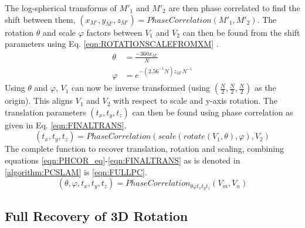 The log-spherical transforms of $M'_1$ and $M'_2$ are then phase correlated to find the shift between them, $(x_{M'},y_{M'},z_{M'}) = PhaseCorrelation(M'_1, M'_2)$. The rotation $\theta$ and scale $\varphi$ factors between $V_1$ and $V_2$ can then be found from the shift parameters using Eq. \ref{eqn:ROTATIONSCALEFROMXM} . 
\begin{equation} \label{eqn:ROTATIONSCALEFROMXM}
\begin{split}
\theta & = \frac{-360x_{M'}}{N}\\
\varphi & = e^{
-\left(
2.56^{-1}N
\right)z_{M'}N^{-1}
}
\end{split}
\end{equation}
Using $\theta$ and $\varphi$, $V_1$ can now be inverse transformed (using $(\frac{N}{2}, \frac{N}{2}, \frac{N}{2})$ as the origin). This aligns $V_1$ and $V_2$ with respect to scale and y-axis rotation. The translation parameters $(t_x, t_y, t_z)$ can then be found using phase correlation as given in Eq. \ref{eqn:FINALTRANS}.
\begin{equation} \label{eqn:FINALTRANS}
(t_x, t_y, t_z) = PhaseCorrelation(scale(rotate(V_1,\theta),\varphi), V_2)
\end{equation}
The complete function to recover translation, rotation and scaling, combining equations \ref{eqn:PHCOR_eq}-\ref{eqn:FINALTRANS} as is denoted in \ref{algorithm:PCSLAM} is \ref{eqn:FULLPC}.
\begin{equation} \label{eqn:FULLPC}
(\theta, \varphi, t_x, t_y, t_z) = PhaseCorrelation_{\theta \varphi t_x t_y t_z}(V_m, V_n)
\end{equation}

\subsection{Full Recovery of 3D Rotation}
